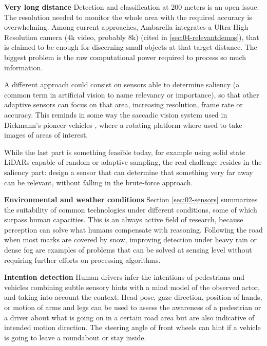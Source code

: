 \textbf{Very long distance} 
    Detection and classification at 200 meters is an open issue.
    The resolution needed to monitor the whole area with the required 
    accuracy is overwhelming. Among current approaches, Ambarella 
    integrates a Ultra High Resolution camera (4k video, probably 8k) 
    (cited in \ref{sec:04-relevantdemos}), that is claimed to be enough for 
    discerning small objects at that target distance. The biggest problem
    is the raw computational power required to process so much information.
    
    A different approach could consist on sensors able to determine 
    saliency (a common term in artificial vision 
    \cite{Zhang2016a,Palazzi2018,Duthon2016} to name relevancy or importance), 
    so that other adaptive sensors can focus on that area, increasing
    resolution, frame rate or accuracy. 
    This reminds in some way the saccadic vision system used in Dickmann's 
    pioneer vehicles \cite{Dickmanns1987,Gregor2002}, where a rotating 
    platform where used to take images of areas of interest.
    
    While the last part is something feasible today, for example using solid
    state LiDARs capable of random or adaptive sampling, the real challenge
    resides in the saliency part: design a sensor that can determine that 
    something very far away can be relevant, without falling in the
    brute-force approach.

\textbf{Environmental and weather conditions}    
    Section \ref{sec:02-sensors} summarizes the suitability of common 
    technologies under different conditions, some of which surpass human 
    capacities. 
    This is an always active field of research, because perception 
    can solve what humans compensate with reasoning. Following the road 
    when most marks are covered by snow, improving detection under heavy 
    rain or dense fog are examples of problems that can be solved at sensing
    level without requiring further efforts on processing algorithms.
        
\textbf{Intention detection}        
    Human drivers infer the intentions of pedestrians and vehicles 
    combining subtle sensory hints with a mind model of the observed actor,
    and taking into account the context.
    Head pose, gaze direction, position of hands, or motion of arms and 
    legs can be used to assess the awareness of a pedestrian or a driver
    about what is going on in a certain road area but are also indicative 
    of intended motion direction. The steering angle of front wheels can
    hint if a vehicle is going to leave a roundabout or stay inside.
            
